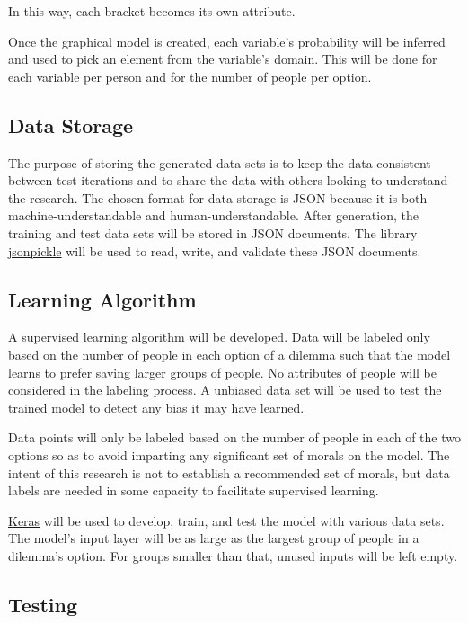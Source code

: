 \documentclass{article}
\begin{document}
In this way, each bracket becomes its own attribute.

Once the graphical model is created, each variable's probability will be inferred and used to pick an element from the variable's domain. This will be done for each variable per person and for the number of people per option.

\subsection{Data Storage}

The purpose of storing the generated data sets is to keep the data consistent between test iterations and to share the data with others looking to understand the research. The chosen format for data storage is JSON because it is both machine-understandable and human-understandable. After generation, the training and test data sets will be stored in JSON documents. The library \href{https://jsonpickle.github.io/}{jsonpickle} will be used to read, write, and validate these JSON documents.

\subsection{Learning Algorithm}

A supervised learning algorithm will be developed. Data will be labeled only based on the number of people in each option of a dilemma such that the model learns to prefer saving larger groups of people. No attributes of people will be considered in the labeling process. A unbiased data set will be used to test the trained model to detect any bias it may have learned.

Data points will only be labeled based on the number of people in each of the two options so as to avoid imparting any significant set of morals on the model. The intent of this research is not to establish a recommended set of morals, but data labels are needed in some capacity to facilitate supervised learning.

\href{https://keras.io/}{Keras} will be used to develop, train, and test the model with various data sets. The model's input layer will be as large as the largest group of people in a dilemma's option. For groups smaller than that, unused inputs will be left empty.

\subsection{Testing}
\end{document}
